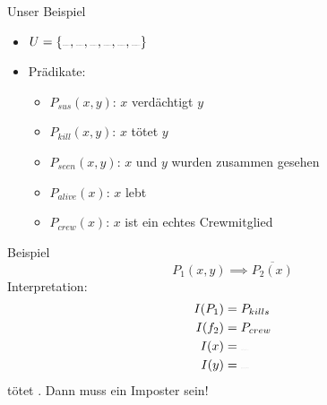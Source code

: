 \begin{frame}{Unser Beispiel}
	\begin{itemize}
		\item $U = \{\sus{red}, \sus{green}, \sus{blue}, \sus{white}, \sus{yellow}, \sus{magenta}\}$
		\item Prädikate:
		      \begin{itemize}
			      \item $P_{sus}(x,y)$: $x$ verdächtigt $y$
			      \item $P_{kill}(x,y)$: $x$ tötet $y$
			      \item $P_{seen}(x,y)$: $x$ und $y$ wurden zusammen gesehen
			      \item $P_{alive}(x)$: $x$ lebt
			      \item $P_{crew}(x)$: $x$ ist ein echtes Crewmitglied
		      \end{itemize}
	\end{itemize}
\end{frame}

\begin{frame}{Beispiel}
	$$P_1(x,y) \implies \overline{P_2(x)}$$
	\pause
	\alert<only:+->{Interpretation:}
	\begin{align*}
		I(P_1) & = P_{kills}   \\
		I(f_2) & = P_{crew}    \\
		I(x)   & = \sus{red}   \\
		I(y)   & = \sus{white}
	\end{align*}
	\pause
	 tötet . Dann muss  ein Imposter sein!
\end{frame}

